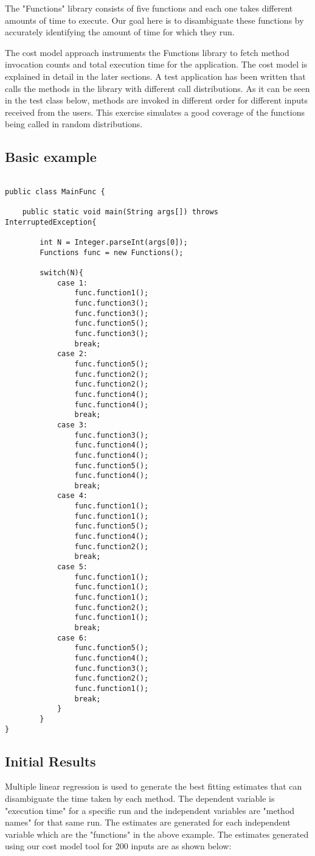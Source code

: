 The "Functions" library consists of five functions and each one takes different amounts of time to execute. Our goal here is to disambiguate these functions by accurately identifying the amount of time for which they run. \newline

The cost model approach instruments the Functions library to fetch method invocation counts and total execution time for the application. The cost model is explained in detail in the later sections. A test application has been written that calls the methods in the library with different call distributions. As it can be seen in the test class below, methods are invoked in different order for different inputs received from the users. This exercise simulates a good coverage of the functions being called in random distributions.

\subsection{Basic example}
\singlespacing
\begin{lstlisting}

public class MainFunc {
	
	public static void main(String args[]) throws InterruptedException{
		
		int N = Integer.parseInt(args[0]);
		Functions func = new Functions();
		
		switch(N){
			case 1:
				func.function1();
				func.function3();
				func.function3();
				func.function5();
				func.function3();
				break;
			case 2:
				func.function5();
				func.function2();
				func.function2();
				func.function4();
				func.function4();
				break;
			case 3:
				func.function3();
				func.function4();
				func.function4();
				func.function5();
				func.function4();
				break;
			case 4:
				func.function1();
				func.function1();
				func.function5();
				func.function4();
				func.function2();
				break;
			case 5:
				func.function1();
				func.function1();
				func.function1();
				func.function2();
				func.function1();
				break;
			case 6:
				func.function5();
				func.function4();
				func.function3();
				func.function2();
				func.function1();
				break;
			}
		}		
}
\end{lstlisting}
\doublespacing

\subsection{Initial Results}
Multiple linear regression is used to generate the best fitting estimates that can disambiguate the time taken by each method. The dependent variable is "execution time" for a specific run and the independent variables are "method names" for that same run. The estimates are generated for each independent variable which are the "functions" in the above example. The estimates generated using our cost model tool for 200 inputs are as shown below: \newline

